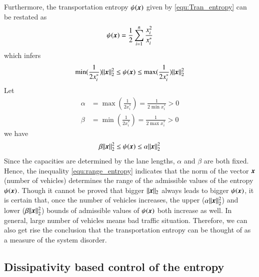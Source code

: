 \documentclass[preprint,authoryear,12pt]{elsarticle}
\renewcommand{\vec}[1]{\mbox{\boldmath$#1$}}
\begin{document}

Furthermore, the transportation entropy $\psi(\vec{x})$ given by
\eqref{equ:Tran_entropy} can be restated as
$$\psi(\vec{x}) = \frac{1}{2}\sum_{i=1}^{n} \frac{x_i^2}{x_i^*}$$
which infers
$$\min(\frac{1}{2x_i^*})\|\vec{x}\|_2^2\le
\psi(\vec{x})
\le\max(\frac{1}{2x_i^*})\|\vec{x}\|_2^2
$$
Let
\begin{align*}
\alpha &= \max(\frac{1}{2x_i^*}) = \frac{1}{2\min{x_i^*}}>0\\
\beta &= \min(\frac{1}{2x_i^*}) = \frac{1}{2\max{x_i^*}}>0
\end{align*}
we have
\begin{equation}\label{equ:range_entropy}
\beta\|\vec{x}\|_2^2 \le\psi(\vec{x})\le \alpha\|\vec{x}\|_2^2
\end{equation}
Since the capacities are determined by the lane lengths, $\alpha$ and
$\beta$ are both fixed. Hence, the inequality
\eqref{equ:range_entropy} indicates that the norm of the vector
$\vec{x}$ (number of vehicles) determines the range of the admissible
values of the entropy $\psi(\vec{x})$. Though it cannot be proved
that bigger $\|\vec{x}\|_2$ always leads to bigger $\psi(\vec{x})$,
it is certain that, once the number of vehicles increases, the upper
($\alpha\|\vec{x}\|_2^2$) and lower ($\beta\|\vec{x}\|_2^2$) bounds
of admissible values of $\psi(\vec{x})$ both increase as well. In
general, large number of vehicles means bad traffic situation.
Therefore,  we can also get rise the conclusion that the
transportation entropy can be thought of as a measure of the system
disorder.

\subsection{Dissipativity based control of the entropy}
\end{document}
